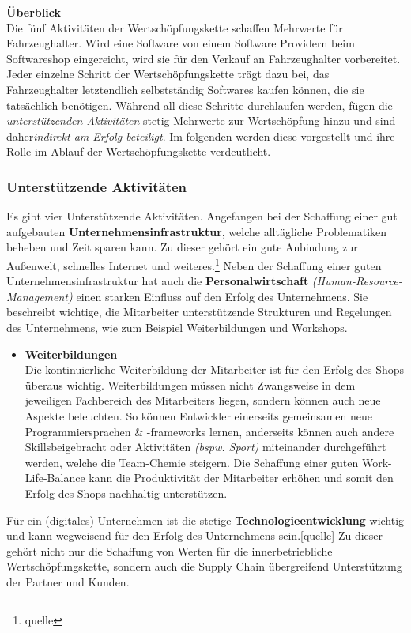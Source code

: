 \textbf{Überblick}\\
Die fünf Aktivitäten der Wertschöpfungskette schaffen Mehrwerte für Fahrzeughalter. Wird eine Software von einem Software Providern beim Softwareshop \glqq eingereicht\grqq, wird sie für den Verkauf an Fahrzeughalter vorbereitet. Jeder einzelne Schritt der Wertschöpfungskette trägt dazu bei, das Fahrzeughalter letztendlich selbstständig Softwares kaufen können, die sie tatsächlich benötigen. Während all diese Schritte durchlaufen werden, fügen die \textit{unterstützenden Aktivitäten} stetig Mehrwerte zur Wertschöpfung hinzu und sind daher\textit{indirekt am Erfolg beteiligt}. Im folgenden werden diese vorgestellt und ihre Rolle im Ablauf der Wertschöpfungskette verdeutlicht.

\subsubsection{Unterstützende Aktivitäten}\label{unterstd_activities}
Es gibt vier Unterstützende Aktivitäten. Angefangen bei der Schaffung einer gut aufgebauten \textbf{Unternehmensinfrastruktur}, welche alltägliche Problematiken beheben und Zeit sparen kann. Zu dieser gehört ein gute Anbindung zur Außenwelt, schnelles Internet und weiteres.\footnote{quelle} Neben der Schaffung einer guten Unternehmensinfrastruktur hat auch die \textbf{Personalwirtschaft} \textit{(Human-Resource-Management)} einen starken Einfluss auf den Erfolg des Unternehmens. Sie beschreibt wichtige, die Mitarbeiter unterstützende Strukturen und Regelungen des Unternehmens, wie zum Beispiel Weiterbildungen und Workshops.
\begin{itemize}
	\item[] \hspace{-0.6cm} \textbf{Weiterbildungen}\\
	Die kontinuierliche Weiterbildung der Mitarbeiter ist für den Erfolg des Shops überaus wichtig. Weiterbildungen müssen nicht Zwangsweise in dem jeweiligen Fachbereich des Mitarbeiters liegen, sondern können auch neue Aspekte beleuchten. So können Entwickler einerseits gemeinsamen neue Programmiersprachen \& -frameworks lernen, anderseits können auch andere \glqq Skills\grqq beigebracht oder Aktivitäten \textit{(bspw. Sport)} miteinander durchgeführt werden, welche die Team-Chemie steigern. Die Schaffung einer guten Work-Life-Balance kann die Produktivität der Mitarbeiter erhöhen\cite[Vgl. S.4]{wlb} und somit den Erfolg des Shops nachhaltig unterstützen.
	
\end{itemize}
Für ein (digitales) Unternehmen ist die stetige \textbf{Technologieentwicklung} wichtig und kann wegweisend für den Erfolg des Unternehmens sein.\ref{quelle} Zu dieser gehört nicht nur die Schaffung von Werten für die innerbetriebliche Wertschöpfungskette, sondern auch die Supply Chain übergreifend Unterstützung der Partner und Kunden.

